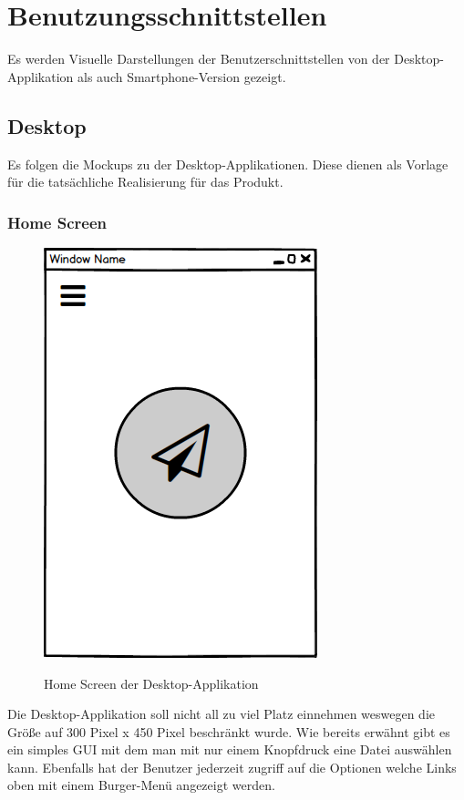\section{Benutzungsschnittstellen}
Es werden Visuelle Darstellungen der Benutzerschnittstellen von der Desktop-Applikation als auch Smartphone-Version gezeigt.
\subsection{Desktop}
Es folgen die Mockups zu der Desktop-Applikationen. Diese dienen als Vorlage für die tatsächliche Realisierung für das Produkt.
\subsubsection{Home Screen}
\begin{figure}[H]
	\centering
	\includegraphics[width=.7\linewidth]{pictures/Desktop/Home.png}\
	\caption{Home Screen der Desktop-Applikation}
\end{figure}
Die Desktop-Applikation soll nicht all zu viel Platz einnehmen weswegen die Größe auf 300 Pixel x 450 Pixel beschränkt wurde. Wie bereits erwähnt gibt es ein simples GUI mit dem man mit nur einem Knopfdruck eine Datei auswählen kann. Ebenfalls hat der Benutzer jederzeit zugriff auf die Optionen welche Links oben mit einem Burger-Menü angezeigt werden.
